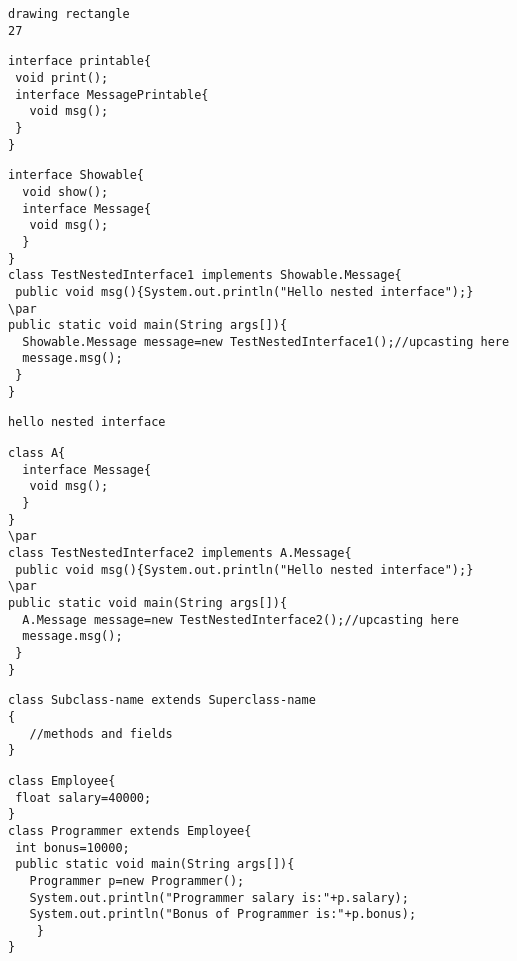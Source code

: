 \documentclass{book}
\def\lthtmlcheckvsize{\ifdim\ht\sizebox<\vsize 
  \ifdim\wd\sizebox<\hsize\expandafter\hfill\fi \expandafter\vfill
  \else\expandafter\vss\fi}%
\begin{document}
{\newpage\clearpage
{}%
\begin{lstlisting}
drawing rectangle
27
\end{lstlisting}%
\lthtmlfigureZ
\lthtmlcheckvsize\clearpage}

{\newpage\clearpage
{}%
\begin{lstlisting}
interface printable{  
 void print();  
 interface MessagePrintable{  
   void msg();  
 }  
}  
\end{lstlisting}%
\lthtmlfigureZ
\lthtmlcheckvsize\clearpage}

{\newpage\clearpage
{}%
\begin{lstlisting}
interface Showable{  
  void show();  
  interface Message{  
   void msg();  
  }  
}  
class TestNestedInterface1 implements Showable.Message{  
 public void msg(){System.out.println("Hello nested interface");}  
\par
public static void main(String args[]){  
  Showable.Message message=new TestNestedInterface1();//upcasting here  
  message.msg();  
 }  
}  
\end{lstlisting}%
\lthtmlfigureZ
\lthtmlcheckvsize\clearpage}

{\newpage\clearpage
{}%
\begin{lstlisting}
hello nested interface
\end{lstlisting}%
\lthtmlfigureZ
\lthtmlcheckvsize\clearpage}

{\newpage\clearpage
{}%
\begin{lstlisting}
class A{  
  interface Message{  
   void msg();  
  }  
}  
\par
class TestNestedInterface2 implements A.Message{  
 public void msg(){System.out.println("Hello nested interface");}  
\par
public static void main(String args[]){  
  A.Message message=new TestNestedInterface2();//upcasting here  
  message.msg();  
 }  
}  
\end{lstlisting}%
\lthtmlfigureZ
\lthtmlcheckvsize\clearpage}

{\newpage\clearpage
{}%
\begin{lstlisting}
class Subclass-name extends Superclass-name  
{  
   //methods and fields  
}
\end{lstlisting}%
\lthtmlfigureZ
\lthtmlcheckvsize\clearpage}

{\newpage\clearpage
{}%
\begin{lstlisting}
class Employee{  
 float salary=40000;  
}  
class Programmer extends Employee{  
 int bonus=10000;  
 public static void main(String args[]){  
   Programmer p=new Programmer();  
   System.out.println("Programmer salary is:"+p.salary);  
   System.out.println("Bonus of Programmer is:"+p.bonus);  
	}  
}  
\end{lstlisting}%
\lthtmlfigureZ
\lthtmlcheckvsize\clearpage}
\end{document}
